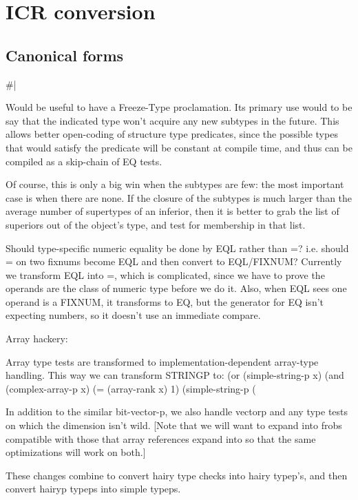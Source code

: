 \chapter{ICR conversion} %



\section{Canonical forms}

\#|

Would be useful to have a Freeze-Type proclamation.  Its primary use would to
be say that the indicated type won't acquire any new subtypes in the future.
This allows better open-coding of structure type predicates, since the possible
types that would satisfy the predicate will be constant at compile time, and
thus can be compiled as a skip-chain of EQ tests.  

Of course, this is only a big win when the subtypes are few: the most important
case is when there are none.  If the closure of the subtypes is much larger
than the average number of supertypes of an inferior, then it is better to grab
the list of superiors out of the object's type, and test for membership in that
list.

Should type-specific numeric equality be done by EQL rather than =?  i.e.
should = on two fixnums become EQL and then convert to EQL/FIXNUM?
Currently we transform EQL into =, which is complicated, since we have to prove
the operands are the class of numeric type before we do it.  Also, when EQL
sees one operand is a FIXNUM, it transforms to EQ, but the generator for EQ
isn't expecting numbers, so it doesn't use an immediate compare.


Array hackery:


Array type tests are transformed to %
implementation-dependent array-type handling.  This way we can transform
STRINGP to:
     (or (simple-string-p x)
	 (and (complex-array-p x)
	      (= (array-rank x) 1)
	      (simple-string-p (%

In addition to the similar bit-vector-p, we also handle vectorp and any type
tests on which the dimension isn't wild.
[Note that we will want to expand into frobs compatible with those that
array references expand into so that the same optimizations will work on both.]

These changes combine to convert hairy type checks into hairy typep's, and then
convert hairyp typeps into simple typeps.


